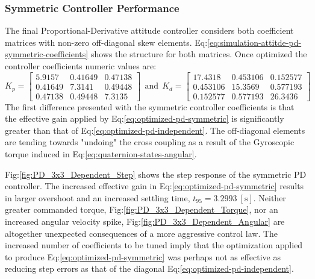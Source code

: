 \subsubsection{Symmetric Controller Performance}
\label{subsubsec:simulation.atttiude.pd.3x3}
The final Proportional-Derivative attitude controller considers both coefficient matrices with non-zero off-diagonal skew elements. Eq:\ref{eq:simulation-attitde-pd-symmetric-coefficients} shows the structure for both matrices. Once optimized the controller coefficients numeric values are:
\begin{equation}\label{eq:optimized-pd-symmetric}
K_p = \begin{bmatrix}
5.9157 & 0.41649 & 0.47138\\
0.41649 & 7.3141 & 0.49448\\
0.47138 & 0.49448 & 7.3135
\end{bmatrix}
~~\text{and}~~K_d = \begin{bmatrix}
17.4318 & 0.453106 & 0.152577\\
0.453106 & 15.3569 & 0.577193\\
0.152577 & 0.577193 & 26.3436
\end{bmatrix}
\end{equation}
The first difference presented with the symmetric controller coefficients is that the effective gain applied by Eq:\ref{eq:optimized-pd-symmetric} is significantly greater than that of Eq:\ref{eq:optimized-pd-independent}. The off-diagonal elements are tending towards "undoing" the cross coupling as a result of the Gyroscopic torque induced in Eq:\ref{eq:quaternion-states-angular}. 
\par
Fig:\ref{fig:PD_3x3_Dependent_Step} shows the step response of the symmetric PD controller. The increased effective gain in Eq:\ref{eq:optimized-pd-symmetric} results in larger overshoot and an increased settling time, $t_{95}=3.2993~[\text{s}]$. Neither greater commanded torque, Fig:\ref{fig:PD_3x3_Dependent_Torque}, nor an increased angular velocity spike, Fig:\ref{fig:PD_3x3_Dependent_Angular} are altogether unexpected consequences of a more aggressive control law. The increased number of coefficients to be tuned imply that the optimization applied to produce Eq:\ref{eq:optimized-pd-symmetric} was perhaps not as effective as reducing step errors as that of the diagonal Eq:\ref{eq:optimized-pd-independent}.
